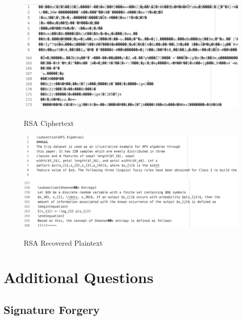 \documentclass[]{article}
\begin{document}
\begin{figure}[H]
	\includegraphics[width=\textwidth]{rsa_cipher1.png}
	\includegraphics[width=\textwidth]{rsa_cipher2.png}	
	\caption{RSA Ciphertext}
	\centering
\end{figure}

\begin{figure}[H]
	\includegraphics[height=\textheight/6,width=\textwidth]{rsa_plain1.png}
	\includegraphics[height=\textheight/6,width=\textwidth]{rsa_plain2.png}	
	\caption{RSA Recovered Plaintext}
	\centering
\end{figure}

\pagebreak


\vspace*{-0.8cm}
\section*{\hfil Additional Questions\hfil}

\subsection*{Signature Forgery}
\end{document}
